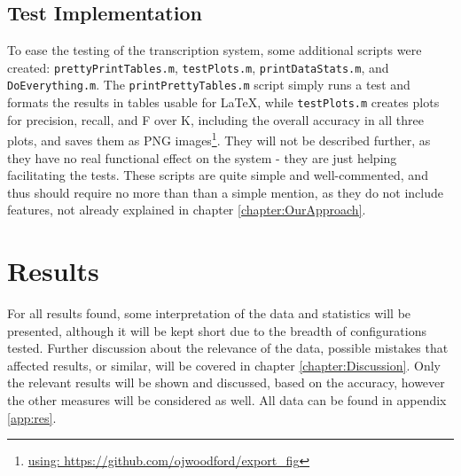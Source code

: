 	\subsection{Test Implementation}		%
		To ease the testing of the transcription system, some additional scripts were created: \texttt{prettyPrintTables.m}, \texttt{testPlots.m}, \texttt{printDataStats.m}, and \texttt{DoEverything.m}.
		The \texttt{printPrettyTables.m} script simply runs a test and formats the results in tables usable for \LaTeX, while \texttt{testPlots.m} creates plots for precision, recall, and F over K, including the overall accuracy in all three plots, and saves them as PNG images\footnote{\url{using: https://github.com/ojwoodford/export\_fig}}. They will not be described further, as they have no real functional effect on the system -  they are just helping facilitating the tests. These scripts are quite simple and well-commented, and thus should require no more than than a simple mention, as they do not include features, not already explained in chapter \ref{chapter:OurApproach}.
			
 
\section{Results}
	
	For all results found, some interpretation of the data and statistics will be presented, although it will be kept short due to the breadth of configurations tested. Further discussion about the relevance of the data, possible mistakes that affected results, or similar, will be covered in chapter \ref{chapter:Discussion}. Only the relevant results will be shown and discussed, based on the accuracy, however the other measures will be considered as well. All data can be found in appendix \ref{app:res}. 

	
